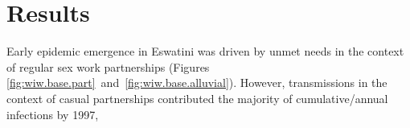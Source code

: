 \section{Results}\label{art.res}
Early epidemic emergence in Eswatini was driven by unmet needs in the context of regular sex work partnerships
(Figures \ref{fig:wiw.base.part}~and~\ref{fig:wiw.base.alluvial}).
However, transmissions in the context of casual partnerships contributed the majority of cumulative/annual infections by 1997, %
